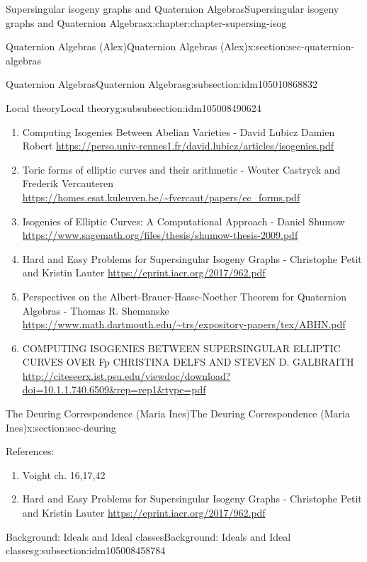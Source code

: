 \documentclass[oneside,10pt,]{book}
\numberwithin{equation}{section}
\begin{document}
\begin{chapterptx}{Supersingular isogeny graphs and Quaternion Algebras}{}{Supersingular isogeny graphs and Quaternion Algebras}{}{}{x:chapter:chapter-supersing-isog}
\begin{sectionptx}{Quaternion Algebras (Alex)}{}{Quaternion Algebras (Alex)}{}{}{x:section:sec-quaternion-algebras}
\begin{subsectionptx}{Quaternion Algebras}{}{Quaternion Algebras}{}{}{g:subsection:idm105010868832}
\begin{subsubsectionptx}{Local theory}{}{Local theory}{}{}{g:subsubsection:idm105008490624}
\begin{enumerate}
\item{}Computing Isogenies Between Abelian Varieties - David Lubicz Damien Robert \url{https://perso.univ-rennes1.fr/david.lubicz/articles/isogenies.pdf}%
\item{}Toric forms of elliptic curves and their arithmetic - Wouter Castryck and Frederik Vercauteren \url{https://homes.esat.kuleuven.be/\~fvercaut/papers/ec_forms.pdf}%
\item{}Isogenies of Elliptic Curves: A Computational Approach - Daniel Shumow \url{https://www.sagemath.org/files/thesis/shumow-thesis-2009.pdf}%
\item{}Hard and Easy Problems for Supersingular Isogeny Graphs - Christophe Petit and Kristin Lauter \url{https://eprint.iacr.org/2017/962.pdf}%
\item{}Perspectives on the Albert-Brauer-Hasse-Noether Theorem for Quaternion Algebras -  Thomas R. Shemanske \url{https://www.math.dartmouth.edu/\~trs/expository-papers/tex/ABHN.pdf}%
\item{}COMPUTING ISOGENIES BETWEEN SUPERSINGULAR ELLIPTIC CURVES OVER Fp CHRISTINA DELFS AND STEVEN D. GALBRAITH \url{http://citeseerx.ist.psu.edu/viewdoc/download?doi=10.1.1.740.6509\&rep=rep1\&type=pdf}%
\end{enumerate}
%
\end{subsubsectionptx}
\end{subsectionptx}
\end{sectionptx}
%
%
\typeout{************************************************}
\typeout{************************************************}
%
\begin{sectionptx}{The Deuring Correspondence (Maria Ines)}{}{The Deuring Correspondence (Maria Ines)}{}{}{x:section:sec-deuring}
\begin{introduction}{}%
References:%
\par
%
\begin{enumerate}
\item{}Voight ch. 16,17,42%
\item{}Hard and Easy Problems for Supersingular Isogeny Graphs - Christophe Petit and Kristin Lauter \url{https://eprint.iacr.org/2017/962.pdf}%
\end{enumerate}
%
\end{introduction}%
%
%
\typeout{************************************************}
\typeout{************************************************}
%
\begin{subsectionptx}{Background: Ideals and Ideal classes}{}{Background: Ideals and Ideal classes}{}{}{g:subsection:idm105008458784}

\end{subsectionptx}
\end{sectionptx}
\end{chapterptx}
\end{document}
